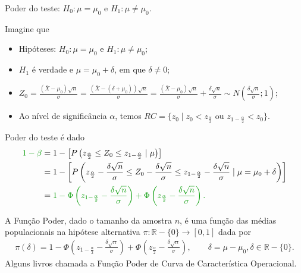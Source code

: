 \documentclass[8pt]{beamer}
\begin{document}
\begin{frame}{Poder do teste: $H_0:\mu = \mu_0$ e $H_1: \mu \neq \mu_0$.}

\small

Imagine que
\begin{itemize}
	\item Hipóteses: $H_0: \mu = \mu_0$ e $H_1: \mu \neq \mu_0$;
	\item $H_1$ é verdade e $\mu = \mu_0 + \delta$, em que $\delta \neq 0$;
	\item $Z_0 = \frac{(\bar{X} - \mu_0)\sqrt{n}}{\sigma} = \frac{(\bar{X} - (\delta + \mu_0))\sqrt{n}}{\sigma} = \frac{(\bar{X} - \mu_0)\sqrt{n}}{\sigma} + \frac{\delta\sqrt{n}}{\sigma} \sim N\left( \frac{\delta \sqrt{n}}{\sigma}; 1 \right)$;
	\item Ao nível de significância $\alpha$, temos $RC = \{ z_0 \mid z_0 < z_{\frac{\alpha}{2}} \mbox{ ou } z_{1-\frac{\alpha}{2}} < z_0  \}$.
\end{itemize}
\vfill	

Poder do teste é dado
\begin{align*}
	\textcolor{important}{1-\beta} &=1 - \left[P\left( z_\frac{\alpha}{2} \leq Z_0 \leq z_{1 - \frac{\alpha}{2}} \mid \mu \right)\right] \\
	&= 1- \left[ P \left( z_\frac{\alpha}{2} - \frac{\delta\sqrt{n}}{\sigma} \leq Z_0 - \frac{\delta\sqrt{n}}{\sigma} \leq z_{1 - \frac{\alpha}{2}} - \frac{\delta\sqrt{n}}{\sigma} \mid \mu = \mu_0 + \delta \right)\right]\\
	&= \textcolor{important}{1 - \Phi\left( z_{1-\frac{\alpha}{2}} - \frac{\delta\sqrt{n}}{\sigma} \right) + \Phi\left( z_{\frac{\alpha}{2}} - \frac{\delta\sqrt{n}}{\sigma} \right).}
\end{align*}
\vfill

A \textcolor{important}{Função Poder}, dado o tamanho da amostra $n$, é uma função das médias populacionais na hipótese alternativa  $\pi: \mathbb{R} - \{0\} \longrightarrow [0,1]$ dada por
\begin{align*}
	\pi(\delta) = 1 - \Phi\left( z_{1-\frac{\alpha}{2}} - \frac{\delta\sqrt{n}}{\sigma} \right) + \Phi\left( z_{\frac{\alpha}{2}} - \frac{\delta\sqrt{n}}{\sigma} \right), \qquad \delta = \mu - \mu_0, \delta \in \mathbb{R} - \{0 \}.
\end{align*}
Alguns livros chamada a Função Poder de \textcolor{important}{Curva de Característica Operacional.}
	
\normalsize	
\end{frame}
\end{document}
